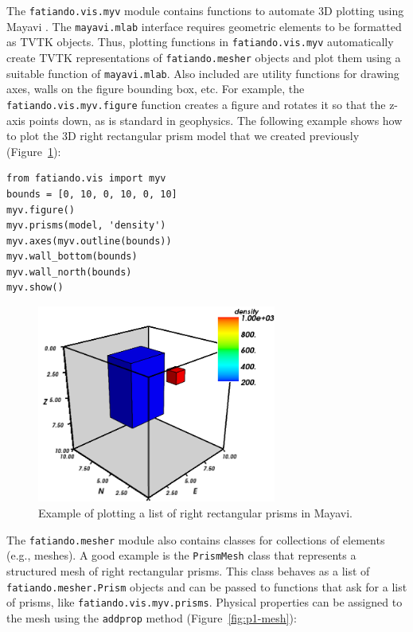 The \texttt{fatiando.vis.myv} module contains functions to automate 3D plotting
using Mayavi \citep{ramachandran2011}. The \texttt{mayavi.mlab} interface
requires geometric elements to be formatted as TVTK objects. Thus, plotting
functions in \texttt{fatiando.vis.myv} automatically create TVTK
representations of \texttt{fatiando.mesher} objects and plot them using a
suitable function of \texttt{mayavi.mlab}. Also included are utility functions
for drawing axes, walls on the figure bounding box, etc. For example, the
\texttt{fatiando.vis.myv.figure} function creates a figure and rotates it so
that the z-axis points down, as is standard in geophysics. The following
example shows how to plot the 3D right rectangular prism model that we created
previously (Figure~\ref{fig:p1-twoprisms}):

\begin{verbatim}
from fatiando.vis import myv
bounds = [0, 10, 0, 10, 0, 10]
myv.figure()
myv.prisms(model, 'density')
myv.axes(myv.outline(bounds))
myv.wall_bottom(bounds)
myv.wall_north(bounds)
myv.show()
\end{verbatim}

\begin{figure}
    \centering
    \includegraphics[width=0.7\textwidth]{figures/paper-fatiando/meshes_3dplotting_2prisms}
    \caption{
        Example of plotting a list of right rectangular prisms in Mayavi.
    }
    \label{fig:p1-twoprisms}
\end{figure}

The \texttt{fatiando.mesher} module also contains classes for
collections of elements (e.g., meshes). A good example is the
\texttt{PrismMesh} class that represents a structured mesh of right
rectangular prisms. This class behaves as a list of
\texttt{fatiando.mesher.Prism} objects and can be passed to functions
that ask for a list of prisms, like \texttt{fatiando.vis.myv.prisms}.
Physical properties can be assigned to the mesh using the
\texttt{addprop} method (Figure~\ref{fig:p1-mesh}):


